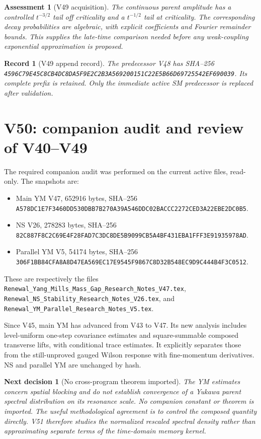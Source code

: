 \documentclass[11pt]{article}
\newtheorem{decision}[theorem]{Next decision}
\newtheorem{assessment}[theorem]{Assessment}
\newtheorem{record}[theorem]{Record}
\theoremstyle{remark}
\begin{document}
\begin{assessment}[V49 acquisition]
\label{ass:v20v49}
The continuous parent amplitude has a controlled \(t^{-3/2}\)
tail off criticality and a \(t^{-1/2}\) tail at criticality.
The corresponding decay probabilities are algebraic, with
explicit coefficients and Fourier remainder bounds.
This supplies the late-time comparison needed before any
weak-coupling exponential approximation is proposed.
\end{assessment}

\begin{record}[V49 append record]
\label{rec:v20v49}
The predecessor V48 has SHA--256
\texttt{4596C79E45C8CB4DC8DA5F9E2C2B3A569200151C22E5B66D69725542EF690039}.
Its complete prefix is retained.  Only the immediate active
SM predecessor is replaced after validation.
\end{record}



\section{V50: companion audit and review of V40--V49}
\label{sec:v20v50}

The required companion audit was performed on the current active
files, read-only.  The snapshots are:
\begin{itemize}
\item Main YM V47, 652916 bytes, SHA--256
\texttt{A578DC1E7F3460DD530DBB7B270A39A546DDC02BACCC2272CED3A22EBE2DC0B5}.
\item NS V26, 278283 bytes, SHA--256
\texttt{82C887F8C2C69E4F28FAD7C3DC8DE5B9099CB5A4BF431EBA1FFF3E91935978AD}.
\item Parallel YM V5, 54174 bytes, SHA--256
\texttt{306F1BB84CFA8A8D47EA569EC17E9545F9867C8D32B548EC9D9C444B4F3C0512}.
\end{itemize}
These are respectively the files
\texttt{Renewal\_Yang\_Mills\_Mass\_Gap\_Research\_Notes\_V47.tex},
\texttt{Renewal\_NS\_Stability\_Research\_Notes\_V26.tex}, and
\texttt{Renewal\_YM\_Parallel\_Research\_Notes\_V5.tex}.

Since V45, main YM has advanced from V43 to V47.  Its new analysis
includes level-uniform one-step covariance estimates and
square-summable composed transverse lifts, with conditional trace
estimates.  It explicitly separates those from the still-unproved
gauged Wilson response with fine-momentum derivatives.  NS and
parallel YM are unchanged by hash.

\begin{decision}[No cross-program theorem imported]
\label{dec:v20v50-audit}
The YM estimates concern spatial blocking and do not establish
convergence of a Yukawa parent spectral distribution on its
resonance scale.  No companion constant or theorem is imported.
The useful methodological agreement is to control the composed
quantity directly.  V51 therefore studies the normalized rescaled
spectral density rather than approximating separate terms of the
time-domain memory kernel.
\end{decision}
\end{document}
